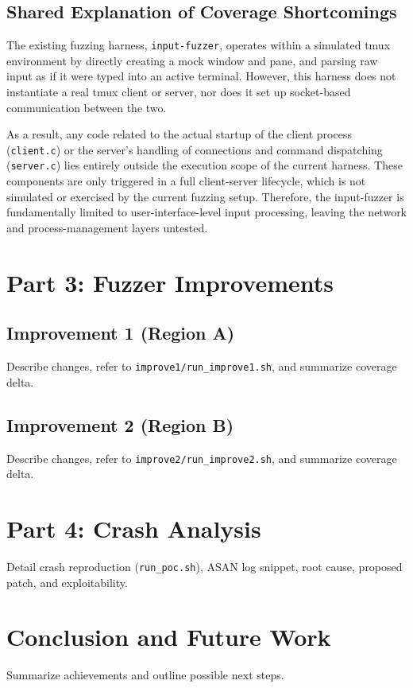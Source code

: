 \documentclass[11pt,a4paper,twocolumn]{article}
\begin{document}
\subsection*{Shared Explanation of Coverage Shortcomings}
The existing fuzzing harness, \texttt{input-fuzzer}, operates within a simulated tmux environment by directly creating a mock window and pane, and parsing raw input as if it were typed into an active terminal. However, this harness does not instantiate a real tmux client or server, nor does it set up socket-based communication between the two.

As a result, any code related to the actual startup of the client process (\texttt{client.c}) or the server's handling of connections and command dispatching (\texttt{server.c}) lies entirely outside the execution scope of the current harness. These components are only triggered in a full client-server lifecycle, which is not simulated or exercised by the current fuzzing setup. Therefore, the input-fuzzer is fundamentally limited to user-interface-level input processing, leaving the network and process-management layers untested.

\section{Part 3: Fuzzer Improvements}

\subsection{Improvement 1 (Region A)}
Describe changes, refer to \texttt{improve1/run\_improve1.sh}, and summarize coverage delta.

\subsection{Improvement 2 (Region B)}
Describe changes, refer to \texttt{improve2/run\_improve2.sh}, and summarize coverage delta.

\section{Part 4: Crash Analysis}
Detail crash reproduction (\texttt{run\_poc.sh}), ASAN log snippet, root cause, proposed patch, and exploitability.

\section{Conclusion and Future Work}
Summarize achievements and outline possible next steps.

\printbibliography
\end{document}
